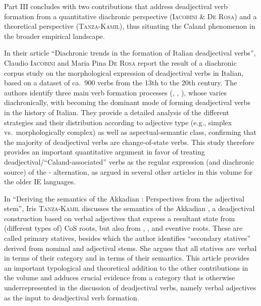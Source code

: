 \documentclass[output=paper,colorlinks,citecolor=brown]{langscibook}
\begin{document}
Part III concludes with two contributions that address deadjectival verb formation from a quantitative diachronic perspective (\textsc{Iacobini} \& \textsc{De Rosa}) and a theoretical perspective (\textsc{Tanza-Kamil}), thus situating the Caland phenomenon  in the broader empirical landscape. 

In their article ``Diachronic trends in the formation of Italian deadjectival verbs'', Claudio \textsc{Iacobini} and Maria Pina \textsc{De Rosa} report the result of a diachronic corpus study on the morphological expression of deadjectival verbs in Italian, based on a dataset of ca.\ 900 verbs from the 13th to the 20th century. The authors identify three main verb formation processes (, , ), whose  varies diachronically, with  becoming the dominant mode of forming deadjectival verbs in the history of Italian. They provide a detailed analysis of the different strategies and their distribution according to adjective type (e.g., simplex vs.\ morphologically complex) as well as aspectual-semantic class, confirming that the majority of deadjectival verbs are change-of-state verbs. This study therefore provides an important quantitative argument in favor of treating deadjectival/``Caland-associated''  verbs as the regular expression (and diachronic source) of the - alternation, as argued in several other articles in this volume for the older IE languages.

In ``Deriving the semantics of the Akkadian : Perspectives from the adjectival stem'', Iris \textsc{Tanza-Kamil} discusses the semantics of the Akkadian , a deadjectival construction  based on verbal adjectives that express a resultant state from (different types of) CoS roots, but also from , , and  eventive roots. These are called  primary statives, besides which the author identifies ``secondary statives'' derived from nominal and adjectival stems. She argues that all statives are verbal in terms of their category and  in terms of their semantics. This article provides an important typological and theoretical addition to the other contributions in the volume and adduces crucial evidence from a category that is otherwise underrepresented in the discussion of deadjectival verbs, namely verbal adjectives as the input to deadjectival verb formation.
\end{document}
